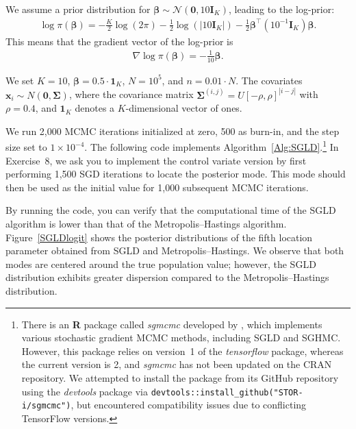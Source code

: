 We assume a prior distribution for \( \boldsymbol{\beta} \sim \mathcal{N}(\mathbf{0}, 10 \mathbf{I}_K) \), leading to the log-prior:
\begin{align*}
	\log \pi(\boldsymbol{\beta}) = -\frac{K}{2} \log(2\pi) - \frac{1}{2} \log\left( \lvert 10 \mathbf{I}_K \rvert \right) - \frac{1}{2} \boldsymbol{\beta}^{\top} (10^{-1} \mathbf{I}_K) \boldsymbol{\beta}.
\end{align*}
This means that the gradient vector of the log-prior is
\begin{align*}
	\nabla \log \pi(\boldsymbol{\beta}) = -\frac{1}{10}\boldsymbol{\beta}. 
\end{align*}

We set \( K = 10 \), \( \boldsymbol{\beta} = 0.5 \cdot \mathbf{1}_K \), \( N = 10^5 \), and \( n = 0.01 \cdot N \). The covariates \( \mathbf{x}_i \sim {N}(\mathbf{0}, \boldsymbol{\Sigma}) \), where the covariance matrix \( \boldsymbol{\Sigma}^{(i,j)} = U[-\rho, \rho]^{|i-j|} \) with \( \rho = 0.4 \), and \( \mathbf{1}_K \) denotes a \( K \)-dimensional vector of ones.

We run 2{,}000 MCMC iterations initialized at zero, 500 as burn-in, and the step size set to \(1 \times 10^{-4}\). The following code implements Algorithm~\ref{Alg:SGLD}.\footnote{There is an \textbf{R} package called \textit{sgmcmc} developed by \cite{baker2019sgmcmc}, which implements various stochastic gradient MCMC methods, including SGLD and SGHMC. However, this package relies on version~1 of the \textit{tensorflow} package, whereas the current version is 2, and \textit{sgmcmc} has not been updated on the CRAN repository. We attempted to install the package from its GitHub repository using the \textit{devtools} package via \texttt{devtools::install\_github("STOR-i/sgmcmc")}, but encountered compatibility issues due to conflicting TensorFlow versions.} In Exercise~8, we ask you to implement the control variate version by first performing 1{,}500 SGD iterations to locate the posterior mode. This mode should then be used as the initial value for 1{,}000 subsequent MCMC iterations.

By running the code, you can verify that the computational time of the SGLD algorithm is lower than that of the Metropolis–Hastings algorithm. Figure~\ref{SGLDlogit} shows the posterior distributions of the fifth location parameter obtained from SGLD and Metropolis–Hastings. We observe that both modes are centered around the true population value; however, the SGLD distribution exhibits greater dispersion compared to the Metropolis–Hastings distribution.

